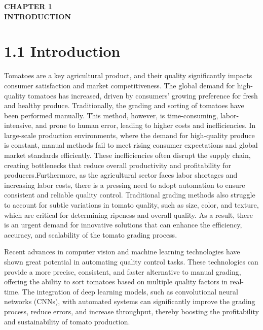 \documentclass[12pt,a4paper]{report}
\begin{document}
		





\setcounter{page}{1}


	\begin{center}
		\textbf{\Large CHAPTER 1}\\[0.5cm]
		\textbf{\Large INTRODUCTION}
	\end{center}
	
\section*{1.1 Introduction}

\hspace{1cm}Tomatoes are a key agricultural product, and their quality significantly impacts consumer satisfaction and market competitiveness. The global demand for high-quality tomatoes has increased, driven by consumers' growing preference for fresh and healthy produce. Traditionally, the grading and sorting of tomatoes have been performed manually. This method, however, is time-consuming, labor-intensive, and prone to human error, leading to higher costs and inefficiencies. In large-scale production environments, where the demand for high-quality produce is constant, manual methods fail to meet rising consumer expectations and global market standards efficiently\cite{ref7}. These inefficiencies often disrupt the supply chain, creating bottlenecks that reduce overall productivity and profitability for producers.Furthermore, as the agricultural sector faces labor shortages and increasing labor costs, there is a pressing need to adopt automation to ensure consistent and reliable quality control. Traditional grading methods also struggle to account for subtle variations in tomato quality, such as size, color, and texture, which are critical for determining ripeness and overall quality. As a result, there is an urgent demand for innovative solutions that can enhance the efficiency, accuracy, and scalability of the tomato grading process.

Recent advances in computer vision and machine learning technologies have shown great potential in automating quality control tasks. These technologies can provide a more precise, consistent, and faster alternative to manual grading, offering the ability to sort tomatoes based on multiple quality factors in real-time. The integration of deep learning models, such as convolutional neural networks (CNNs), with automated systems can significantly improve the grading process, reduce errors, and increase throughput, thereby boosting the profitability and sustainability of tomato production.
\end{document}
